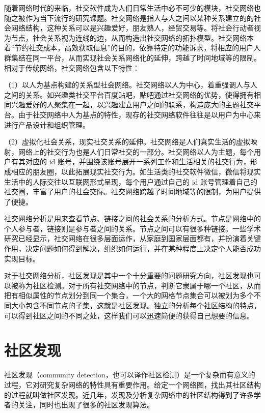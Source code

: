 随着网络时代的来临，社交软件成为人们日常生活中必不可少的模块，社交网络也随之被作为当下流行的研究课题。社交网络是指人与人之间以某种关系建立的的社会网络结构，这种关系可以是兴趣爱好，朋友熟人，经贸交易等。将社会行动者视为节点，社会关系视为连线的边，从而构造出社交网络的拓扑模型。社交网络本着“节约社交成本，高效获取信息”的目的，依靠特定的功能诉求，将相应的用户人群集结在同一平台，从而实现社会关系网络化的延伸，跨越了时间地域等的限制。相对于传统网络，社交网络包含以下特性：

（1）以人为基点构建的关系型社会网络。社交网络以人为中心，着重强调人与人之间的关系。如兴趣类社交平台百度贴吧，贴吧通过社交网络的优势，使得拥有相同兴趣爱好的人聚集在一起，以兴趣建立用户之间的联系，构造庞大的主题社交平台。由于社交网络中人为基点的特性，现存的社交网络软件往往是以用户为中心来进行产品设计和组织管理。

（2）虚拟化社会关系，现实社交关系的延伸。社交网络是人们真实生活的虚拟映射，网络上的社交行为也是人们日常社交的一部分。社交网络以人为主题，每个用户有其对应的 id 账号，并围绕该账号展开一系列工作和生活相关的社交行为，形成相应的朋友圈，以此拓展现实社交行为。如生活类的社交软件微信，微信将现实生活中的人际交往以互联网形式呈现，每个用户通过自己的 id 账号管理着自己的社交圈，丰富了用户的社会交际。社交网络跨越了时间地域等的限制，为用户提供了便捷。

社交网络分析是用来查看节点、链接之间的社会关系的分析方式。节点是网络中的个人参与者，链接则是参与者之间的关系。节点之间可以有很多种链接。一些学术研究已经显示，社交网络在很多层面运作，从家庭到国家层面都有，并扮演着关键作用，决定问题如何得到解决，组织如何运行，并在某种程度上决定个人能否成功实现目标。

对于社交网络分析，社区发现是其中一个十分重要的问题研究方向，社区发现也可以被称为社区检测。对于所有社交网络中的节点，判断它隶属于哪一个社区，从而把有相似属性的节点划分到同一个集合，一个大的网格节点集合可以被划为多个不同大小包含不同节点的子集，这就是社区发现。独立的分析每个社区结构的特点，可以得到社区之间的不同之处，这样我们可以迅速简便的获得自己想要的信息。

\section{社区发现}

社区发现（community detection，也可以译作社区检测）是一个复杂而有意义的过程，它对研究复杂网络的特性具有重要作用。给定一个网络图，找出其社区结构的过程就叫做社区发现。近几年，发现及分析复杂网络中的社区结构得到了许多学者的关注，同时也出现了很多的社区发现算法。


